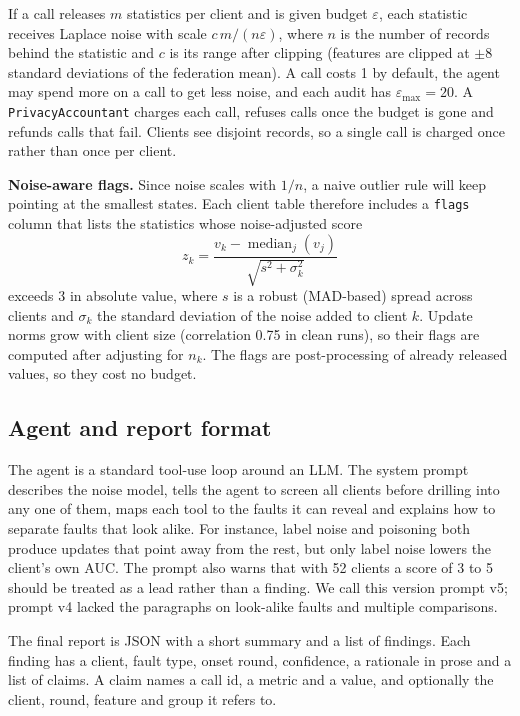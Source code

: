 \documentclass[conference]{IEEEtran}
\begin{document}
If a call releases $m$ statistics per client and is given budget $\varepsilon$, each statistic
receives Laplace noise with scale $c\,m/(n\varepsilon)$, where $n$ is the number of records behind
the statistic and $c$ is its range after clipping (features are clipped at $\pm 8$ standard
deviations of the federation mean). A call costs 1 by default, the agent may spend more on a call to
get less noise, and each audit has $\varepsilon_{\max} = 20$. A \texttt{PrivacyAccountant} charges
each call, refuses calls once the budget is gone and refunds calls that fail. Clients see disjoint
records, so a single call is charged once rather than once per client.

\textbf{Noise-aware flags.} Since noise scales with $1/n$, a naive outlier rule will keep pointing
at the smallest states. Each client table therefore includes a \texttt{flags} column that lists the
statistics whose noise-adjusted score
\begin{equation}
z_k = \frac{v_k - \operatorname{median}_j(v_j)}{\sqrt{s^2 + \sigma_k^2}}
\end{equation}
exceeds 3 in absolute value, where $s$ is a robust (MAD-based) spread across clients and $\sigma_k$
the standard deviation of the noise added to client $k$. Update norms grow with client size
(correlation 0.75 in clean runs), so their flags are computed after adjusting for $n_k$. The flags
are post-processing of already released values, so they cost no budget.

\subsection{Agent and report format}

The agent is a standard tool-use loop around an LLM. The system prompt describes the noise model,
tells the agent to screen all clients before drilling into any one of them, maps each tool to the
faults it can reveal and explains how to separate faults that look alike. For instance, label noise
and poisoning both produce updates that point away from the rest, but only label noise lowers the
client's own AUC. The prompt also warns that with 52 clients a score of 3 to 5 should be treated as
a lead rather than a finding. We call this version prompt v5; prompt v4 lacked the paragraphs on
look-alike faults and multiple comparisons.

The final report is JSON with a short summary and a list of findings. Each finding has a client,
fault type, onset round, confidence, a rationale in prose and a list of claims. A claim names a call
id, a metric and a value, and optionally the client, round, feature and group it refers to.
\end{document}
